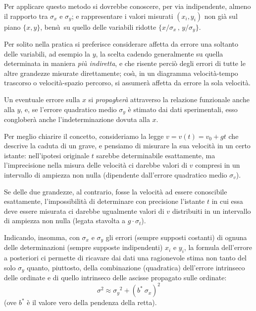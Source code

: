 Per applicare questo metodo si dovrebbe conoscere, per via
indipendente, almeno il rapporto tra $\sigma_x$ e
$\sigma_y$; e rappresentare i valori misurati $( x_i , y_i
)$ non gi\`a sul piano $\{ x,y \}$, bens\`\i\ su quello
delle variabili ridotte $\{ x/\sigma_x \, , \, y/\sigma_y
\}$.

Per solito nella pratica si preferisce considerare affetta
da errore una soltanto delle variabili, ad esempio la $y$,
la scelta cadendo generalmente su quella determinata in
maniera \emph{pi\`u indiretta}, e che risente perci\`o degli
errori di tutte le altre grandezze misurate direttamente;
cos\`\i, in un diagramma velocit\`a-tempo trascorso o
velocit\`a-spazio percorso, si assumer\`a affetta da errore
la sola velocit\`a.

Un eventuale errore sulla $x$ si \emph{propagher\`a}
attraverso la relazione funzionale anche alla $y$, e, se
l'errore quadratico medio $\sigma_y$ \`e stimato dai dati
sperimentali, esso conglober\`a anche l'indeterminazione
dovuta alla $x$.

Per meglio chiarire il concetto, consideriamo la legge $v =
v(t) = v_0 + g t$ che descrive la caduta di un grave, e
pensiamo di misurare la sua velocit\`a in un certo istante:
nell'ipotesi originale $t$ sarebbe determinabile
esattamente, ma l'imprecisione nella misura delle velocit\`a
ci darebbe valori di $v$ compresi in un intervallo di
ampiezza non nulla (dipendente dall'errore quadratico medio
$\sigma_v$).

Se delle due grandezze, al contrario, fosse la velocit\`a ad
essere conoscibile esattamente, l'impossibilit\`a di
determinare con precisione l'istante $t$ in cui essa deve
essere misurata ci darebbe ugualmente valori di $v$
distribuiti in un intervallo di ampiezza non nulla (legata
stavolta a $g \cdot \sigma_t$).

Indicando, insomma, con $\sigma_x$ e $\sigma_y$ gli errori
(sempre supposti costanti) di ognuna delle determinazioni
(sempre supposte indipendenti) $x_i$ e $y_i$, la formula
dell'errore a posteriori ci permette di ricavare dai dati
una ragionevole stima non tanto del solo $\sigma_y$ quanto,
piuttosto, della combinazione (quadratica) dell'errore
intrinseco delle ordinate e di quello intrinseco delle
ascisse propagato sulle ordinate:
\begin{equation*}
  \sigma^2 \approx {\sigma_y}^2 + \left( b^* \: \sigma_x
    \right)^2
\end{equation*}
(ove $b^*$ \`e il valore vero della pendenza della retta).%

